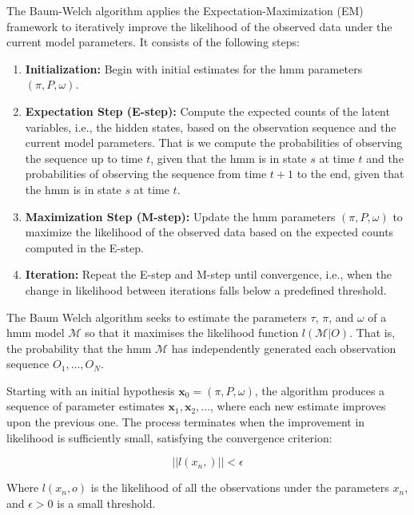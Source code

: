 The Baum-Welch algorithm applies the Expectation-Maximization (EM) framework to iteratively improve the likelihood of the observed data under the current model parameters.
It consists of the following steps:

\begin{enumerate}
    \item \textbf{Initialization:} Begin with initial estimates for the \gls{hmm} parameters $(\pi, P, \omega)$.
    \item \textbf{Expectation Step (E-step):} Compute the expected counts of the latent variables, i.e., the hidden states, based on the observation sequence and the current model parameters.
    That is we compute the probabilities of observing the sequence up to time $t$, given that the \gls{hmm} is in state $s$ at time $t$ and the probabilities of observing the sequence from time $t+1$ to the end, given that the \gls{hmm} is in state $s$ at time $t$.
    \item \textbf{Maximization Step (M-step):} Update the \gls{hmm} parameters $(\pi, P, \omega)$ to maximize the likelihood of the observed data based on the expected counts computed in the E-step.
    \item \textbf{Iteration:} Repeat the E-step and M-step until convergence, i.e., when the change in likelihood between iterations falls below a predefined threshold.
\end{enumerate}

The Baum Welch algorithm seeks to estimate the parameters $\tau$, $\pi$, and $\omega$ of a \gls{hmm} model $\mathcal{M}$ so that it maximises the likelihood function $l(\mathcal{M} | O)$.
That is, the probability that the \gls{hmm} $\mathcal{M}$ has independently generated each observation sequence $O_1, \ldots, O_N$. 

Starting with an initial hypothesis $\textbf{x}_0 = (\pi, P, \omega)$, the algorithm produces a sequence of parameter estimates $\textbf{x}_1, \textbf{x}_2, \ldots$, where each new estimate improves upon the previous one.
The process terminates when the improvement in likelihood is sufficiently small, satisfying the convergence criterion:

\[
    ||l(x_n, )|| < \epsilon
\]

Where $l(x_n, o)$ is the likelihood of all the observations under the parameters $x_n$, and $\epsilon > 0$ is a small threshold.

